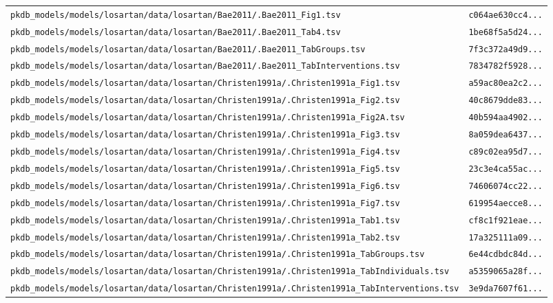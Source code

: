 \documentclass{article}
\begin{document}
\begin{longtable}{ll}
\texttt{pkdb\_models/models/losartan/data/losartan/Bae2011/.Bae2011\_Fig1.tsv} & \texttt{c064ae630cc4...} \\
\texttt{pkdb\_models/models/losartan/data/losartan/Bae2011/.Bae2011\_Tab4.tsv} & \texttt{1be68f5a5d24...} \\
\texttt{pkdb\_models/models/losartan/data/losartan/Bae2011/.Bae2011\_TabGroups.tsv} & \texttt{7f3c372a49d9...} \\
\texttt{pkdb\_models/models/losartan/data/losartan/Bae2011/.Bae2011\_TabInterventions.tsv} & \texttt{7834782f5928...} \\
\texttt{pkdb\_models/models/losartan/data/losartan/Christen1991a/.Christen1991a\_Fig1.tsv} & \texttt{a59ac80ea2c2...} \\
\texttt{pkdb\_models/models/losartan/data/losartan/Christen1991a/.Christen1991a\_Fig2.tsv} & \texttt{40c8679dde83...} \\
\texttt{pkdb\_models/models/losartan/data/losartan/Christen1991a/.Christen1991a\_Fig2A.tsv} & \texttt{40b594aa4902...} \\
\texttt{pkdb\_models/models/losartan/data/losartan/Christen1991a/.Christen1991a\_Fig3.tsv} & \texttt{8a059dea6437...} \\
\texttt{pkdb\_models/models/losartan/data/losartan/Christen1991a/.Christen1991a\_Fig4.tsv} & \texttt{c89c02ea95d7...} \\
\texttt{pkdb\_models/models/losartan/data/losartan/Christen1991a/.Christen1991a\_Fig5.tsv} & \texttt{23c3e4ca55ac...} \\
\texttt{pkdb\_models/models/losartan/data/losartan/Christen1991a/.Christen1991a\_Fig6.tsv} & \texttt{74606074cc22...} \\
\texttt{pkdb\_models/models/losartan/data/losartan/Christen1991a/.Christen1991a\_Fig7.tsv} & \texttt{619954aecce8...} \\
\texttt{pkdb\_models/models/losartan/data/losartan/Christen1991a/.Christen1991a\_Tab1.tsv} & \texttt{cf8c1f921eae...} \\
\texttt{pkdb\_models/models/losartan/data/losartan/Christen1991a/.Christen1991a\_Tab2.tsv} & \texttt{17a325111a09...} \\
\texttt{pkdb\_models/models/losartan/data/losartan/Christen1991a/.Christen1991a\_TabGroups.tsv} & \texttt{6e44cdbdc84d...} \\
\texttt{pkdb\_models/models/losartan/data/losartan/Christen1991a/.Christen1991a\_TabIndividuals.tsv} & \texttt{a5359065a28f...} \\
\texttt{pkdb\_models/models/losartan/data/losartan/Christen1991a/.Christen1991a\_TabInterventions.tsv} & \texttt{3e9da7607f61...} \\

\end{longtable}
\end{document}
